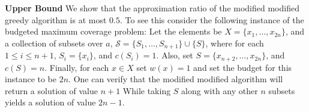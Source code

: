 \textbf{Upper Bound}
We show that the approximation ratio of the modified modified greedy algorithm is at most $0.5$.
To see this consider the following instance of the budgeted maximum coverage problem:
Let the elements be $X = \{x_1, \dots, x_{2n}\}$, 
and a collection of subsets over $a$, $\mathcal{S} = \{S_1, \dots, S_{n + 1}\} \cup \{S\}$,
where for each $1 \leq i \leq n + 1$, $S_i = \{x_i\}$, and $c(S_i) = 1$. 
Also, set $S = \{x_{n + 2}, \dots, x_{2n}\}$, and $c(S) = n$.
Finally, for each $x \in X$ set $w(x) = 1$ and set the budget for this instance to be $2n$.
One can verify that the modified modified algorithm will return a solution of value $n + 1$
While taking $S$ along with any other $n$ subsets yields a solution of value $2n - 1$.  



